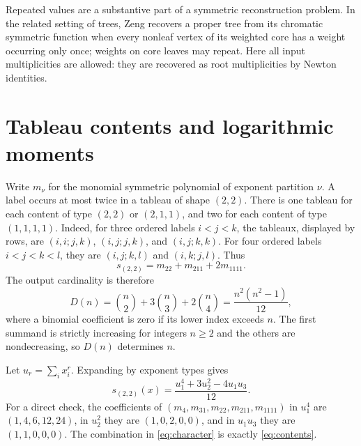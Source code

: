 \documentclass[11pt]{amsart}
\theoremstyle{remark}
\begin{document}
Repeated values are a substantive part of a symmetric reconstruction
problem. In the related setting of trees, Zeng
\cite[Theorem~1.1, Lemmas~2.2 and~3.1]{Zeng2026MultiplicityArxiv}
recovers a proper tree from its chromatic symmetric function when every
nonleaf vertex of its weighted core has a weight occurring only once;
weights on core leaves may repeat. Here all input multiplicities are
allowed: they are recovered as root multiplicities by Newton identities.

\section{Tableau contents and logarithmic moments}

Write $m_\nu$ for the monomial symmetric polynomial of exponent partition
$\nu$. A label occurs at most twice in a tableau of shape $(2,2)$.
There is one tableau for each content of type $(2,2)$ or $(2,1,1)$,
and two for each content of type $(1,1,1,1)$. Indeed, for three ordered
labels $i<j<k$, the tableaux, displayed by rows, are
$(i,i;j,k)$, $(i,j;j,k)$, and $(i,j;k,k)$. For four ordered labels
$i<j<k<l$, they are $(i,j;k,l)$ and $(i,k;j,l)$. Thus
\begin{equation}\label{eq:contents}
 s_{(2,2)}=m_{22}+m_{211}+2m_{1111}.
\end{equation}
The output cardinality is therefore
\begin{equation}\label{eq:cardinality}
 D(n)=\binom n2+3\binom n3+2\binom n4
     =\frac{n^2(n^2-1)}{12},
\end{equation}
where a binomial coefficient is zero if its lower index exceeds $n$.
The first summand is strictly increasing for integers $n\geq2$ and the
others are nondecreasing, so $D(n)$ determines $n$.

Let $u_r=\sum_i x_i^r$. Expanding by exponent types gives
\begin{equation}\label{eq:character}
 s_{(2,2)}(x)=\frac{u_1^4+3u_2^2-4u_1u_3}{12}.
\end{equation}
For a direct check, the coefficients of
$(m_4,m_{31},m_{22},m_{211},m_{1111})$ in $u_1^4$ are
$(1,4,6,12,24)$, in $u_2^2$ they are $(1,0,2,0,0)$, and in
$u_1u_3$ they are $(1,1,0,0,0)$. The combination in
\eqref{eq:character} is exactly \eqref{eq:contents}.
\end{document}
